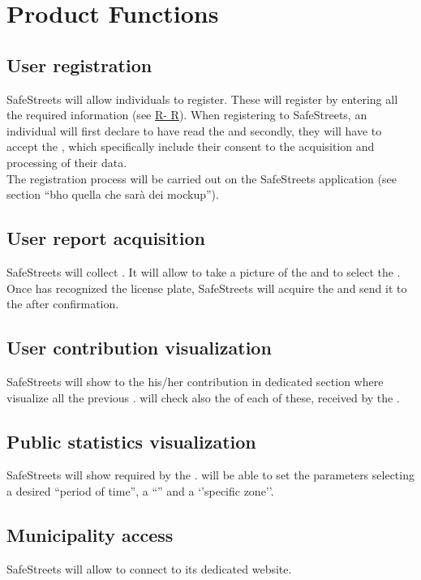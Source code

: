 \documentclass[../../rasd.tex]{subfiles}
\begin{document}
	
	\section{Product Functions}
	
	\subsection{User registration}
	SafeStreets will allow individuals to register. These will register by entering all the required information (see \hyperref[sect:3.2.5]{R- R}). When registering to SafeStreets, an individual will first declare to have read the  and secondly, they will have to accept the , which specifically include their consent to the acquisition and processing of their data. \\
	The  registration process will be carried out on the SafeStreets application (see section “bho quella che sarà dei mockup”). 
	
	\subsection{User report acquisition}
	SafeStreets will collect . It will allow  to take a picture of the  and to select the . Once  has recognized the license plate, SafeStreets will acquire the  and send it to the  after  confirmation. 
	
	\subsection{User contribution visualization}
	SafeStreets will show to the  his/her contribution in dedicated section where visualize all the previous .  will check also the  of each of these, received by the . 
	
	\subsection{Public statistics visualization}
	SafeStreets will show  required by the .  will be able to set the parameters selecting a desired “period of time”, a “” and a ‘’specific zone’’. 
	
	\subsection{Municipality access}
	SafeStreets will allow  to connect to its dedicated website.  
	
\end{document}
